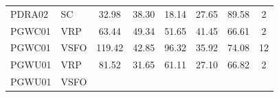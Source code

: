 \documentclass[11pt,a4paper]{article}
\begin{document}
\begin{table}[H]
\begin{tabular}{llcccccc}
    \\

    PDRA02 &
    SC &

    
        32.98
     &

    
        38.30
     &

    
        18.14
     &

    
        27.65
     &

    
        89.58
     &

    
        2
    
    \\

    PGWC01 &
    VRP &

    
        63.44
     &

    
        49.34
     &

    
        51.65
     &

    
        41.45
     &

    
        66.61
     &

    
        2
    
    \\

    PGWC01 &
    VSFO &

    
        119.42
     &

    
        42.85
     &

    
        96.32
     &

    
        35.92
     &

    
        74.08
     &

    
        12
    
    \\

    PGWU01 &
    VRP &

    
        81.52
     &

    
        31.65
     &

    
        61.11
     &

    
        27.10
     &

    
        66.82
     &

    
        2
    
    \\

    PGWU01 &
    VSFO &


\end{tabular}
\end{table}
\end{document}
